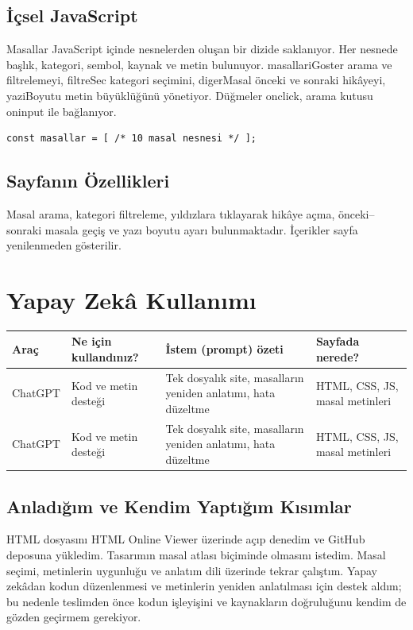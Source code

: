\documentclass[12pt,a4paper]{article}
\begin{document}
\subsection{İçsel JavaScript}
Masallar JavaScript içinde nesnelerden oluşan bir dizide saklanıyor. Her nesnede başlık, kategori, sembol, kaynak ve metin bulunuyor. masallariGoster arama ve filtrelemeyi, filtreSec kategori seçimini, digerMasal önceki ve sonraki hikâyeyi, yaziBoyutu metin büyüklüğünü yönetiyor. Düğmeler onclick, arama kutusu oninput ile bağlanıyor.

\begin{lstlisting}[caption={İçsel JavaScript'ten önemli bir bölüm}]
const masallar = [ /* 10 masal nesnesi */ ];
\end{lstlisting}

\subsection{Sayfanın Özellikleri}
Masal arama, kategori filtreleme, yıldızlara tıklayarak hikâye açma, önceki--sonraki masala geçiş ve yazı boyutu ayarı bulunmaktadır. İçerikler sayfa yenilenmeden gösterilir.


\section{Yapay Zekâ Kullanımı}


\begin{longtable}{@{}p{2.6cm}p{3.6cm}p{4.2cm}p{3.4cm}@{}}
\toprule
\textbf{Araç} & \textbf{Ne için kullandınız?} & \textbf{İstem (prompt) özeti} & \textbf{Sayfada nerede?} \\
\midrule
\endhead
ChatGPT & Kod ve metin desteği & Tek dosyalık site, masalların yeniden anlatımı, hata düzeltme & HTML, CSS, JS, masal metinleri \\
ChatGPT & Kod ve metin desteği & Tek dosyalık site, masalların yeniden anlatımı, hata düzeltme & HTML, CSS, JS, masal metinleri \\
\bottomrule
\end{longtable}

\subsection{Anladığım ve Kendim Yaptığım Kısımlar}
HTML dosyasını HTML Online Viewer üzerinde açıp denedim ve GitHub deposuna yükledim. Tasarımın masal atlası biçiminde olmasını istedim. Masal seçimi, metinlerin uygunluğu ve anlatım dili üzerinde tekrar çalıştım. Yapay zekâdan kodun düzenlenmesi ve metinlerin yeniden anlatılması için destek aldım; bu nedenle teslimden önce kodun işleyişini ve kaynakların doğruluğunu kendim de gözden geçirmem gerekiyor.
\end{document}

